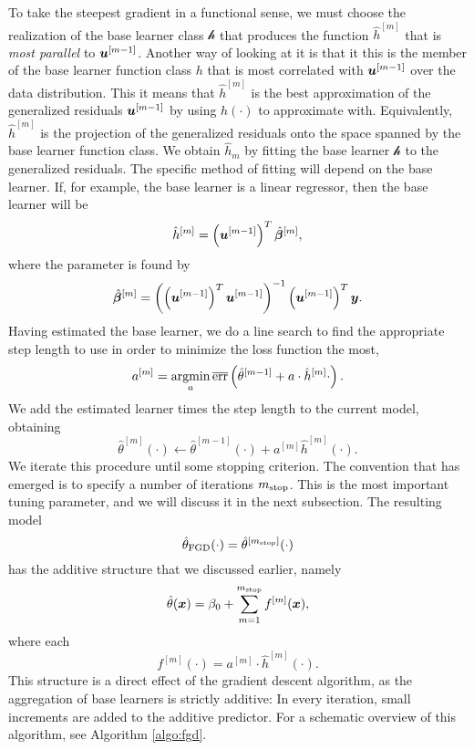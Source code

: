To take the steepest gradient in a functional sense, we must choose the realization of the base learner class $\mathcal{h}$ that produces the function $\hat{h}^{[m]}$ that is \textit{most parallel} to $\bm{u}^{[m-1]}$.
Another way of looking at it is that it this is the member of the base learner function class $h$ that is most correlated with $\bm{u}^{[m-1]}$ over the data distribution.
This it means that $\hat{h}^{[m]}$ is the best approximation of the generalized residuals $\bm{u}^{[m-1]}$ by using $h(\cdot)$ to approximate with.
Equivalently, $\hat{h}^{[m]}$ is the projection of the generalized residuals onto the space spanned by the base learner function class.
We obtain $\hat{h}_m$ by fitting the base learner $\mathcal{h}$ to the generalized residuals.
The specific method of fitting will depend on the base learner.
If, for example, the base learner is a linear regressor, then the base learner will be
\begin{equation*}
    \hat{h}^{[m]}=\left(\bm{u}^{[m-1]}\right)^T\hat{\boldsymbol{\beta}}^{[m]},
\end{equation*}
where the parameter is found by
\begin{equation*}
    \hat{\boldsymbol{\beta}}^{[m]}=\left(\left(\bm{u}^{[m-1]}\right)^T\bm{u}^{[m-1]}\right)^{-1}\left(\bm{u}^{[m-1]}\right)^T\bm{y}.
\end{equation*}
Having estimated the base learner, we do a line search to find the appropriate step length to use in order to minimize the loss function the most,
\begin{equation*}
    a^{[m]}=\operatorname*{argmin}_{a}\overline{\text{err}}\left(\hat{\theta}^{[m-1]}+a\cdot\hat{h}^{[m]}{\cdot}\right).
\end{equation*}
We add the estimated learner times the step length to the current model, obtaining
\begin{equation*}
    \hat{\theta}^{[m]}(\cdot)\gets \hat{\theta}^{[m-1]}(\cdot)+a^{[m]}\hat{h}^{[m]}(\cdot).
\end{equation*}
We iterate this procedure until some stopping criterion.
The convention that has emerged is to specify a number of iterations $m_{\text{stop}}$.
This is the most important tuning parameter, and we will discuss it in the next subsection.
The resulting model
\begin{equation*}
    \hat{\theta}_{\text{FGD}}(\cdot)=\hat{\theta}^{[m_{\text{stop}}]}(\cdot)
\end{equation*}
has the additive structure that we discussed earlier, namely
\begin{equation*}
    \hat{\theta}(\bm{x})=\beta_0+\sum_{m=1}^{m_{\text{stop}}}f^{[m]}(\bm{x}),
\end{equation*}
where each
\begin{equation*}
    f^{[m]}(\cdot)=a^{[m]}\cdot \hat{h}^{[m]}(\cdot).
\end{equation*}
This structure is a direct effect of the gradient descent algorithm, as the aggregation of base learners is strictly additive:
In every iteration, small increments are added to the additive predictor.
For a schematic overview of this algorithm, see Algorithm \ref{algo:fgd}.

